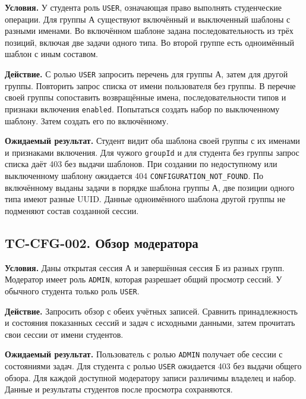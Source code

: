 \documentclass[12pt,a4paper]{article}
\begin{document}
\hypertarget{tc-cfg-001-доступность-и-порядок-шаблонов-задач}{}

\hypertarget{tc-cfg-001}{}

\textbf{Условия.} У студента роль \texttt{USER}, означающая право выполнять студенческие операции. Для группы А существуют включённый и выключенный шаблоны с разными именами. Во включённом шаблоне задана последовательность из трёх позиций, включая две задачи одного типа. Во второй группе есть одноимённый шаблон с иным составом.

\textbf{Действие.} С ролью \texttt{USER} запросить перечень для группы А, затем для другой группы. Повторить запрос списка от имени пользователя без группы. В перечне своей группы сопоставить возвращённые имена, последовательности типов и признаки включения \texttt{enabled}. Попытаться создать набор по выключенному шаблону. Затем создать его по включённому.

\textbf{Ожидаемый результат.} Студент видит оба шаблона своей группы с их именами и признаками включения. Для чужого \texttt{groupId} и для студента без группы запрос списка даёт 403 без выдачи шаблонов. При создании по недоступному или выключенному шаблону ожидается 404 \texttt{CONFIGURATION\_\allowbreak{}NOT\_\allowbreak{}FOUND}. По включённому выданы задачи в порядке шаблона группы А, две позиции одного типа имеют разные UUID. Данные одноимённого шаблона другой группы не подменяют состав созданной сессии.

\subsection{TC-CFG-002. Обзор модератора}\label{tc-cfg-002-ux43eux431ux437ux43eux440-ux43cux43eux434ux435ux440ux430ux442ux43eux440ux430}

\hypertarget{tc-cfg-002-обзор-модератора}{}

\hypertarget{tc-cfg-002}{}

\textbf{Условия.} Даны открытая сессия А и завершённая сессия Б из разных групп. Модератор имеет роль \texttt{ADMIN}, которая разрешает общий просмотр сессий. У обычного студента только роль \texttt{USER}.

\textbf{Действие.} Запросить обзор с обеих учётных записей. Сравнить принадлежность и состояния показанных сессий и задач с исходными данными, затем прочитать свои сессии от имени студентов.

\textbf{Ожидаемый результат.} Пользователь с ролью \texttt{ADMIN} получает обе сессии с состояниями задач. Для студента с ролью \texttt{USER} ожидается 403 без выдачи общего обзора. Для каждой доступной модератору записи различимы владелец и набор. Данные и результаты студентов после просмотра сохраняются.
\end{document}
